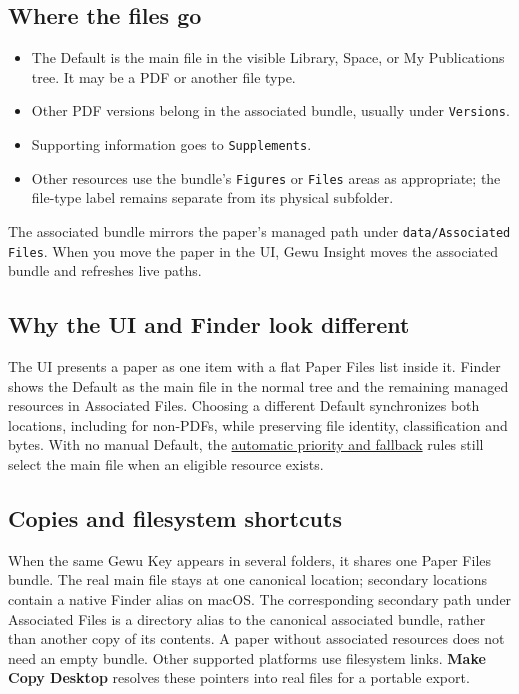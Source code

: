 \documentclass[10pt,letterpaper,oneside]{scrreprt}
\providecommand{\tightlist}{\setlength{\itemsep}{1pt}\setlength{\parskip}{0pt}}
\begin{document}
\subsection{Where the files go}\label{where-the-files-go}

\begin{itemize}
\tightlist
\item
  The Default is the main file in the visible Library, Space, or My Publications tree. It may be a PDF or another file type.
\item
  Other PDF versions belong in the associated bundle, usually under \texttt{Versions}.
\item
  Supporting information goes to \texttt{Supplements}.
\item
  Other resources use the bundle's \texttt{Figures} or \texttt{Files} areas as appropriate; the file-type label remains separate from its physical subfolder.
\end{itemize}

The associated bundle mirrors the paper's managed path under \nolinkurl{data/Associated Files}. When you move the paper in the UI, Gewu Insight moves the associated bundle and refreshes live paths.

\subsection{Why the UI and Finder look different}\label{why-the-ui-and-finder-look-different}

The UI presents a paper as one item with a flat Paper Files list inside it. Finder shows the Default as the main file in the normal tree and the remaining managed resources in Associated Files. Choosing a different Default synchronizes both locations, including for non-PDFs, while preserving file identity, classification and bytes. With no manual Default, the \hyperref[versions-current]{automatic priority and fallback} rules still select the main file when an eligible resource exists.

\subsection{Copies and filesystem shortcuts}\label{copies-and-filesystem-shortcuts}

When the same Gewu Key appears in several folders, it shares one Paper Files bundle. The real main file stays at one canonical location; secondary locations contain a native Finder alias on macOS. The corresponding secondary path under Associated Files is a directory alias to the canonical associated bundle, rather than another copy of its contents. A paper without associated resources does not need an empty bundle. Other supported platforms use filesystem links. \textbf{Make Copy Desktop} resolves these pointers into real files for a portable export.
\end{document}
